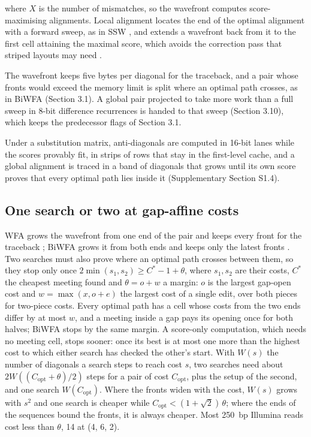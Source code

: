 where \(X\) is the number of mismatches, so the wavefront computes score-maximising alignments. Local alignment locates the end of the optimal alignment with a forward sweep, as in SSW \citep{Zhao2013ssw}, and extends a wavefront back from it to the first cell attaining the maximal score, which avoids the correction pass that striped layouts may need \citep{Farrar2007striped}.

The wavefront keeps five bytes per diagonal for the traceback, and a pair whose fronts would exceed the memory limit is split where an optimal path crosses, as in BiWFA (Section 3.1). A global pair projected to take more work than a full sweep in 8-bit difference recurrences \citep{Suzuki2018diff} is handed to that sweep (Section 3.10), which keeps the predecessor flags of Section 3.1.

Under a substitution matrix, anti-diagonals \citep{Wozniak1997} are computed in 16-bit lanes while the scores provably fit, in strips of rows that stay in the first-level cache, and a global alignment is traced in a band of diagonals that grows until its own score proves that every optimal path lies inside it (Supplementary Section S1.4).

\subsection{One search or two at gap-affine costs}

WFA grows the wavefront from one end of the pair and keeps every front for the traceback \citep{MarcoSola2021wfa}; BiWFA grows it from both ends and keeps only the latest fronts \citep{MarcoSola2023biwfa}. Two searches must also prove where an optimal path crosses between them, so they stop only once \(2\min(s_1, s_2) \ge C^* - 1 + \theta\), where \(s_1, s_2\) are their costs, \(C^*\) the cheapest meeting found and \(\theta = o + w\) a margin: \(o\) is the largest gap-open cost and \(w = \max(x, o+e)\) the largest cost of a single edit, over both pieces for two-piece costs. Every optimal path has a cell whose costs from the two ends differ by at most \(w\), and a meeting inside a gap pays its opening once for both halves; BiWFA stops by the same margin. A score-only computation, which needs no meeting cell, stops sooner: once its best is at most one more than the highest cost to which either search has checked the other's start. With \(W(s)\) the number of diagonals a search steps to reach cost \(s\), two searches need about \(2W((C_{\mathrm{opt}}+\theta)/2)\) steps for a pair of cost \(C_{\mathrm{opt}}\), plus the setup of the second, and one search \(W(C_{\mathrm{opt}})\). Where the fronts widen with the cost, \(W(s)\) grows with \(s^2\) and one search is cheaper while \(C_{\mathrm{opt}} < (1+\sqrt2)\,\theta\); where the ends of the sequences bound the fronts, it is always cheaper. Most 250~bp Illumina reads cost less than \(\theta\), 14 at (4, 6, 2).

